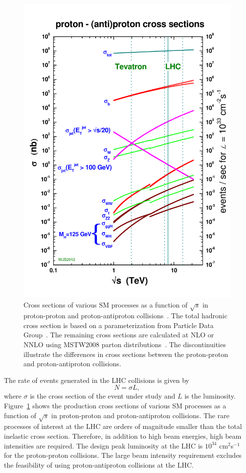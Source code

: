 \begin{figure}[h]
\centering
\includegraphics[width=0.5\columnwidth]{figures_chapter2/crosssections2013}
\caption{Cross sections of various SM processes as a function of $\sqrt{s}$ in proton-proton and proton-antiproton collisions~\cite{sterling}. The total hadronic cross section is based on a parameterization from Particle Data Group~\cite{Agashe:2014kda}. The remaining cross sections are calculated at NLO or NNLO using MSTW2008 parton distributions~\cite{MSTW}. The discontinuities illustrate the differences in cross sections between the proton-proton and proton-antiproton collisions.}
\label{fig:xsec}
\end{figure}

The rate of events generated in the LHC collisions is given by 
\begin{equation} \label{eq:lumi}
N = \sigma L,
\end{equation}
where $\sigma$ is the cross section of the event under study and $L$ is the luminosity. Figure~\ref{fig:xsec} shows the production cross sections of various SM processes as a function of $\sqrt{s}$ in proton-proton and proton-antiproton collisions. The rare processes of interest at the LHC are orders of magnitude smaller than the total inelastic cross section. Therefore, in addition to high beam energies, high beam intensities are required. The design peak luminosity at the LHC is $10^{34}$ cm$^2$s$^{-1}$ for the proton-proton collisions. The large beam intensity requirement excludes the feasibility of using proton-antiproton collisions at the LHC. 

